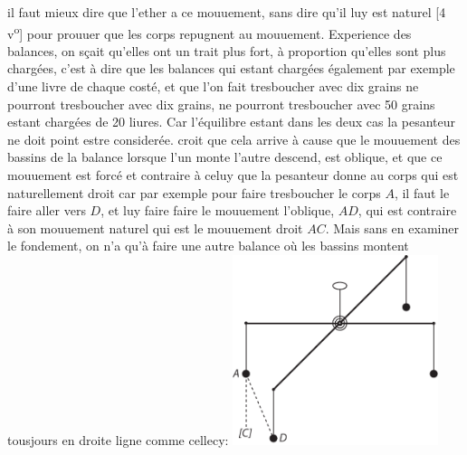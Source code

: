 il faut mieux dire que l'ether\protect{} a ce mouuement, sans dire qu'il luy est naturel
%
[4 v\textsuperscript{o}]
%
pour prouuer que les corps repugnent au mouuement.%
\pend%
\pstart%
\protect{}Experience%
des balances,\protect{}
on s\c{c}ait qu'elles ont un trait plus fort, \`{a} proportion qu'elles sont plus charg\'{e}es,
c'est \`{a} dire que les \protect{}balances qui estant
charg\'{e}es \'{e}galement par exemple d'une livre de chaque cost\'{e}, et que l'on fait tresboucher avec dix grains ne
pourront tresboucher avec dix grains, ne pourront tresboucher avec 50 grains estant charg\'{e}es de 20 liures.
Car l'\'{e}quilibre estant dans les deux cas la pesanteur\protect{} ne doit point estre consider\'{e}e.
croit que cela arrive \`{a} cause que le mouuement des bassins\protect{} de la balance\protect{}
lorsque l'un monte l'autre descend, est oblique, et que
ce mouuement est forc\'{e} et contraire \`{a} celuy que la pesanteur\protect{} donne au corps qui est naturellement droit
car par exemple pour faire tresboucher le corps $A$, il faut le faire aller vers $D$, et luy faire faire le mouuement
l'oblique, $AD$, qui est contraire \`{a} son mouuement naturel qui est le mouuement droit $AC$.
Mais sans en examiner le
fondement, on n'a qu'\`{a} faire une autre balance\protect{}
o\`{u} les bassins\protect{} montent tousjours en droite ligne comme cellecy:%
%
%
\pend%
\vspace{0.7em}%
\pstart%
\centering\includegraphics[width=0.45\textwidth]{images/LBr719a_3-4_d4.pdf}\\
